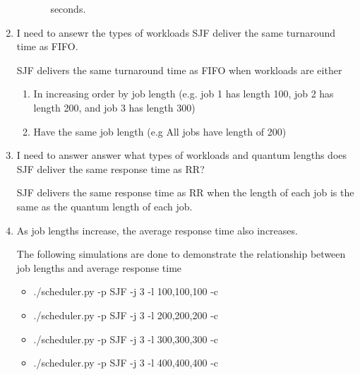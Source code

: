 \documentclass[12pt]{article}
\begin{document}
\begin{enumerate}[1.]
\begin{itemize}
\begin{itemize}
            seconds.
        \end{itemize}
    \end{itemize}

    \item

    I need to ansewr the types of workloads SJF deliver the same turnaround time as FIFO.

    \bigskip

    SJF delivers the same turnaround time as FIFO when workloads are either

    \begin{enumerate}[1.]
        \item In increasing order by job length (e.g. job 1 has length 100, job 2 has length 200, and job 3 has length 300)
        \item Have the same job length (e.g All jobs have length of 200)
    \end{enumerate}

    \item

    I need to answer answer what types of workloads and quantum lengths does SJF deliver the same response
    time as RR?

    \bigskip

    SJF delivers the same response time as RR when the length of each job is the same
    as the quantum length of each job.

    \item

    As job lengths increase, the average response time also increases.

    \bigskip

    The following simulations are done to demonstrate the relationship between
    job lengths and average response time

    \begin{itemize}
        \item ./scheduler.py -p SJF -j 3 -l 100,100,100 -c
        \item ./scheduler.py -p SJF -j 3 -l 200,200,200 -c
        \item ./scheduler.py -p SJF -j 3 -l 300,300,300 -c
        \item ./scheduler.py -p SJF -j 3 -l 400,400,400 -c
    \end{itemize}



\end{enumerate}
\end{document}
